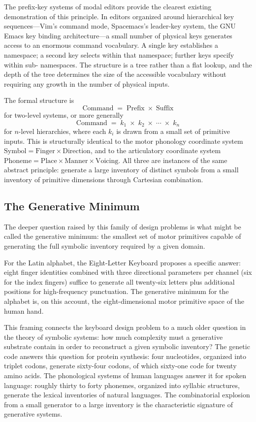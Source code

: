 \documentclass[12pt,a4paper]{article}
\theoremstyle{plain}
\theoremstyle{definition}
\theoremstyle{remark}
\begin{document}
The prefix-key systems of modal editors provide the clearest existing
demonstration of this principle. In editors organized around hierarchical key
sequences---Vim's command mode, Spacemacs's leader-key system, the GNU Emacs
key binding architecture---a small number of physical keys generates access
to an enormous command vocabulary. A single key establishes a namespace; a
second key selects within that namespace; further keys specify within sub-
namespaces. The structure is a tree rather than a flat lookup, and the depth
of the tree determines the size of the accessible vocabulary without requiring
any growth in the number of physical inputs.

The formal structure is
\[
  \text{Command} \;=\; \text{Prefix} \;\times\; \text{Suffix}
\]
for two-level systems, or more generally
\[
  \text{Command} \;=\; k_1 \;\times\; k_2 \;\times\; \cdots \;\times\; k_n
\]
for $n$-level hierarchies, where each $k_i$ is drawn from a small set of
primitive inputs. This is structurally identical to the motor phonology
coordinate system $\text{Symbol} = \text{Finger} \times \text{Direction}$,
and to the articulatory coordinate system $\text{Phoneme} = \text{Place} \times
\text{Manner} \times \text{Voicing}$. All three are instances of the same
abstract principle: generate a large inventory of distinct symbols from a small
inventory of primitive dimensions through Cartesian combination.

\subsection{The Generative Minimum}

The deeper question raised by this family of design problems is what might be
called the generative minimum: the smallest set of motor primitives capable of
generating the full symbolic inventory required by a given domain.

For the Latin alphabet, the Eight-Letter Keyboard proposes a specific answer:
eight finger identities combined with three directional parameters per channel
(six for the index fingers) suffice to generate all twenty-six letters plus
additional positions for high-frequency punctuation. The generative minimum for
the alphabet is, on this account, the eight-dimensional motor primitive space
of the human hand.

This framing connects the keyboard design problem to a much older question
in the theory of symbolic systems: how much complexity must a generative
substrate contain in order to reconstruct a given symbolic inventory? The
genetic code answers this question for protein synthesis: four nucleotides,
organized into triplet codons, generate sixty-four codons, of which sixty-one
code for twenty amino acids. The phonological systems of human languages answer
it for spoken language: roughly thirty to forty phonemes, organized into syllabic
structures, generate the lexical inventories of natural languages. The
combinatorial explosion from a small generator to a large inventory is the
characteristic signature of generative systems.
\end{document}
